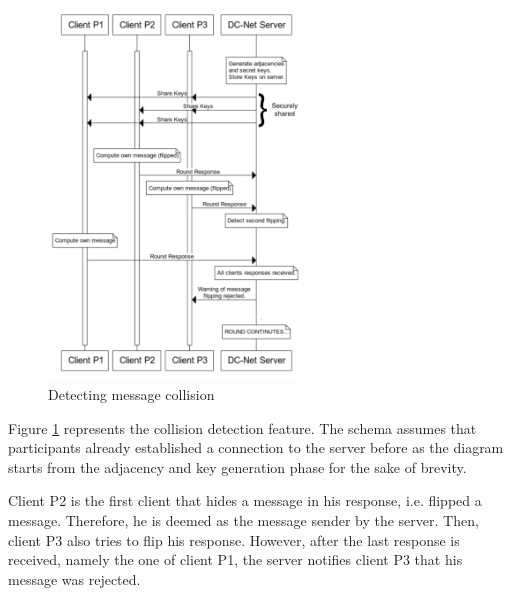 \begin{figure}[H]
    \centering
    \includegraphics[width=0.6\textwidth]{Images/Design/collisionDetection.png}
    \caption{Detecting message collision}
    \label{fig:collisionDetection}
\end{figure}

Figure \ref{fig:collisionDetection} represents the collision detection feature. The schema assumes that participants already established a connection to the server before as the diagram starts from the adjacency and key generation phase for the sake of brevity.

Client P2 is the first client that hides a message in his response, i.e. flipped a message. Therefore, he is deemed as the message sender by the server. Then, client P3 also tries to flip his response. However, after the last response is received, namely the one of client P1, the server notifies client P3 that his message was rejected.

